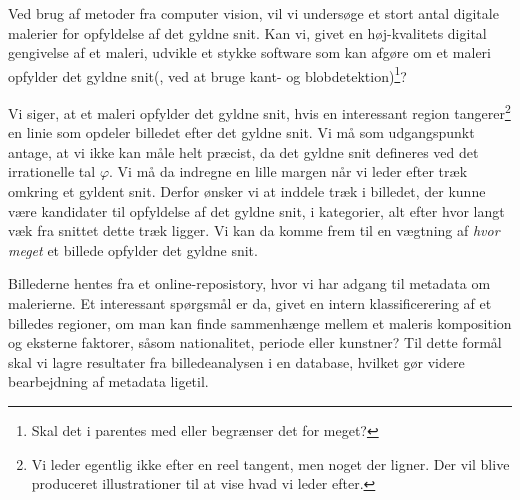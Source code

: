 Ved brug af metoder fra computer vision, vil vi undersøge et stort antal
digitale malerier for opfyldelse af det gyldne snit. Kan vi, givet en
høj-kvalitets digital gengivelse af et maleri, udvikle et stykke software som
kan afgøre om et maleri opfylder det gyldne snit(, ved at bruge kant- og
blobdetektion)\footnote{Skal det i parentes med eller begrænser det for
meget?}?

Vi siger, at et maleri opfylder det gyldne snit, hvis en interessant region
tangerer\footnote{Vi leder egentlig ikke efter en reel tangent, men noget der
ligner. Der vil blive produceret illustrationer til at vise hvad vi leder
efter.} en linie som opdeler billedet efter det gyldne snit. Vi må som
udgangspunkt antage, at vi ikke kan måle helt præcist, da det gyldne snit
defineres ved det irrationelle tal $\varphi$. Vi må da indregne en lille margen
når vi leder efter træk omkring et gyldent snit.  Derfor ønsker vi at inddele
træk i billedet, der kunne være kandidater til opfyldelse af det gyldne snit, i
kategorier, alt efter hvor langt væk fra snittet dette træk ligger. Vi kan da
komme frem til en vægtning af \emph{hvor meget} et billede opfylder det gyldne
snit.

Billederne hentes fra et online-reposistory, hvor vi har adgang til metadata om
malerierne. Et interessant spørgsmål er da, givet en intern klassificerering af
et billedes regioner, om man kan finde sammenhænge mellem et maleris
komposition og eksterne faktorer, såsom nationalitet, periode eller kunstner?
Til dette formål skal vi lagre resultater fra billedeanalysen i en database,
hvilket gør videre bearbejdning af metadata ligetil.
